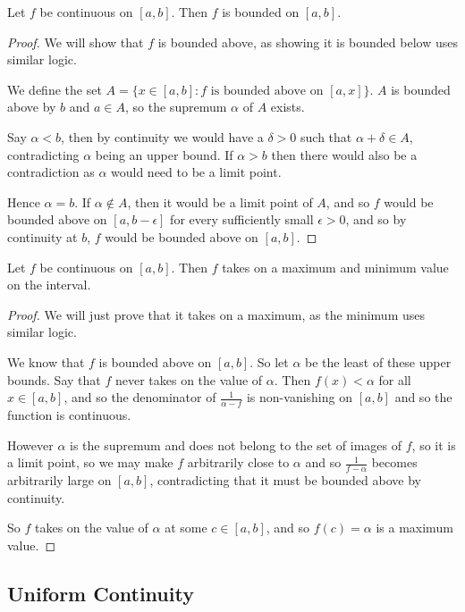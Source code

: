 \documentclass[]{article}
\begin{document}
\begin{thm}
		Let $f$ be continuous on $[a,b]$. Then $f$ is bounded on $[a,b]$.	
\end{thm}

\begin{proof}
		We will show that $f$ is bounded above, as showing it is bounded below uses similar logic. 

		We define the set $A = \{x \in [a,b] :  \text{$f$ is bounded above on $[a,x]$}\}$. $A$ is bounded above by $b$ and $a \in A$, so the supremum $\alpha$ of  $A$ exists.

		Say $\alpha < b$, then by continuity we would have a $\delta > 0$ such that $\alpha + \delta \in A$, contradicting $\alpha$ being an upper bound. If $\alpha > b$ then there would also be a contradiction as $\alpha$ would need to be a limit point.

		Hence $\alpha = b$. If $\alpha \notin A$, then it would be a limit point of $A$, and so $f$ would be bounded above on $[a,b-\epsilon]$ for every sufficiently small $\epsilon > 0$, and so by continuity at $b$, $f$ would be bounded above on $[a,b]$.
\end{proof}

\begin{thm}
		Let $f$ be continuous on $[a,b]$. Then $f$ takes on a maximum and minimum value on the interval.
\end{thm}

\begin{proof}
	We will just prove that it takes on a maximum, as the minimum uses similar logic.

	We know that $f$ is bounded above on $[a,b]$. So let $\alpha$ be the least of these upper bounds. Say that $f$ never takes on the value of $\alpha$. Then $f(x) < \alpha$ for all $x \in [a,b]$, and so the denominator of $\frac{1}{\alpha - f}$ is non-vanishing on $[a,b]$ and so the function is continuous.

	However $\alpha$ is the supremum and does not belong to the set of images of $f$, so it is a limit point, so we may make $f$ arbitrarily close to $\alpha$ and so $\frac{1}{f - \alpha}$ becomes arbitrarily large on $[a,b]$, contradicting that it must be bounded above by continuity.

	So $f$ takes on the value of $\alpha$ at some $c \in [a,b]$, and so $f(c) = \alpha$ is a maximum value.
\end{proof}

\subsection{Uniform Continuity}
\end{document}
